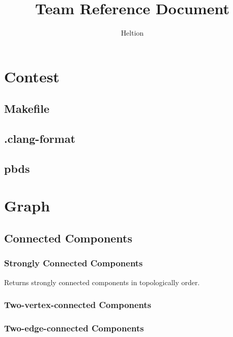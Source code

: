 \documentclass{article}
\begin{document}
\title{Team Reference Document}
\author{Heltion}
\maketitle
\newpage
\begin{multicols}{2}
    \tableofcontents
    \newpage
    \setcounter{page}{1}
    \footnotesize

    \section{Contest}
    \subsection{Makefile}
    
    \subsection{.clang-format}
    
    \subsection{pbds}
    

    \section{Graph}
    \subsection{Connected Components}
    \subsubsection{Strongly Connected Components}
    Returns strongly connected components in topologically order.
    

    \subsubsection{Two-vertex-connected Components}
    

    \subsubsection{Two-edge-connected Components}
    


\end{multicols}
\end{document}
